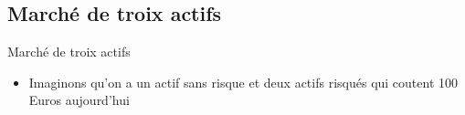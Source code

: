 \documentclass[10pt]{beamer}
\begin{document}
\subsection{Marché de troix actifs}
\begin{frame}{Marché de troix actifs}{}
  \begin{itemize}
    \item Imaginons qu'on a un actif sans risque et deux actifs risqués qui coutent 100 Euros aujourd'hui\\~\\
  \end{itemize}
  
 

\begin{figure}[t]
\centering



\end{figure}

\end{frame}
\end{document}
